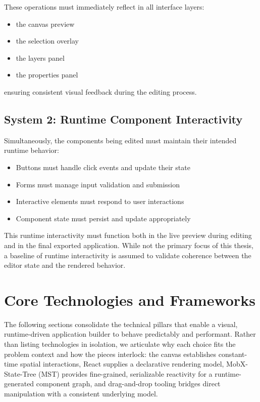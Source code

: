 \documentclass[oneside,12pt]{book}
\begin{document}
These operations must immediately reflect in all interface layers:

\begin{itemize}
  \nopagebreak
  \item the canvas preview
  \item the selection overlay
  \item the layers panel
  \item the properties panel
\end{itemize}
ensuring consistent visual feedback during the editing process.

\newpage

\subsection{System 2: Runtime Component Interactivity}
Simultaneously, the components being edited must maintain their intended runtime behavior:
\begin{itemize}
    \item Buttons must handle click events and update their state
    \item Forms must manage input validation and submission
    \item Interactive elements must respond to user interactions
    \item Component state must persist and update appropriately
\end{itemize}

This runtime interactivity must function both in the live preview during editing and in the final exported application. While not the primary focus of this thesis, a baseline of runtime interactivity is assumed to validate coherence between the editor state and the rendered behavior.

\section{Core Technologies and Frameworks}
\label{sec:core-technologies}

The following sections consolidate the technical pillars that enable a visual, runtime-driven application builder to behave predictably and performant. Rather than listing technologies in isolation, we articulate why each choice fits the problem context and how the pieces interlock: the canvas establishes constant-time spatial interactions, React supplies a declarative rendering model, MobX-State-Tree (MST) provides fine-grained, serializable reactivity for a runtime-generated component graph, and drag-and-drop tooling bridges direct manipulation with a consistent underlying model.
\end{document}
